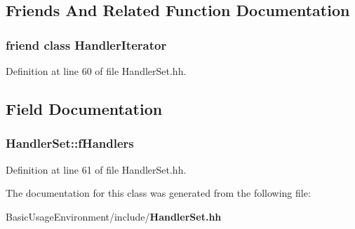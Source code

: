 \subsection{Friends And Related Function Documentation}
\subsubsection[{Handler\+Iterator}]{\setlength{\rightskip}{0pt plus 5cm}friend class {\bf Handler\+Iterator}\hspace{0.3cm}{\ttfamily [friend]}}\label{classHandlerSet_a63006f30a683052753f1cada175b2180}


Definition at line 60 of file Handler\+Set.\+hh.



\subsection{Field Documentation}
\subsubsection[{f\+Handlers}]{ Handler\+Set\+::f\+Handlers\hspace{0.3cm}{\ttfamily [private]}}\label{classHandlerSet_ae9f2b1c476d29083e1d8288de3883dfd}


Definition at line 61 of file Handler\+Set.\+hh.



The documentation for this class was generated from the following file\+:\begin{DoxyCompactItemize}
\item 
Basic\+Usage\+Environment/include/{\bf Handler\+Set.\+hh}\end{DoxyCompactItemize}
